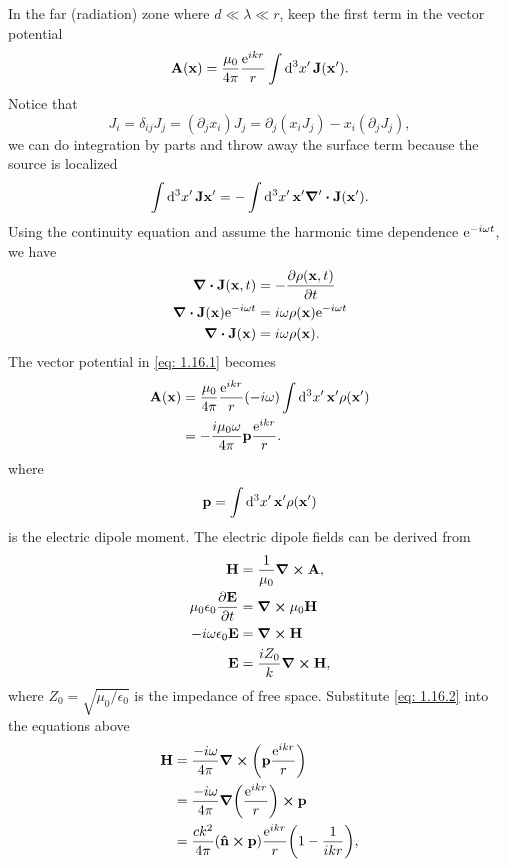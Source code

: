 \documentclass[10pt]{article}
\begin{document}
In the far (radiation) zone where $d \ll \lambda \ll r$, keep the first term in the vector potential
\begin{equation}
	\vb{A}(\vb{x}) = \frac{\mu_0}{4\pi} \frac{{\mathrm{e}}^{ikr}}{r} \int \dd[3]{x'} \vb{J}(\vb{x'}). \label{eq: 1.16.1}
\end{equation}
Notice that
\begin{equation}
	J_i = \delta_{ij} J_j = (\partial_j x_i) J_j = \partial_j(x_i J_j) - x_i (\partial_j J_j),
\end{equation}
we can do integration by parts and throw away the surface term because the source is localized
\begin{equation}
	\int \dd[3]{x'} \vb{J}{\vb{x'}} = - \int \dd[3]{x'} \vb{x'} \grad' \vdot \vb{J}(\vb{x'}).
\end{equation}
Using the continuity equation and assume the harmonic time dependence ${\mathrm{e}}^{-i\omega t}$, we have
\begin{align*}
	\div{\vb{J}(\vb{x},t)} &= -\pdv{\rho(\vb{x},t)}{t} \\
	\div{\vb{J}(\vb{x})} {\mathrm{e}}^{-i\omega t} &= i\omega \rho(\vb{x}) {\mathrm{e}}^{-i\omega t} \\
	\div{\vb{J}(\vb{x})} &= i\omega \rho(\vb{x}).
\end{align*}
The vector potential in \eqref{eq: 1.16.1} becomes
\begin{align}
	\vb{A}(\vb{x}) &= \frac{\mu_0}{4\pi} \frac{{\mathrm{e}}^{ikr}}{r} (-i\omega) \int \dd[3]{x'} \vb{x'} \rho(\vb{x'}) \nonumber \\
	&= -\frac{i \mu_0 \omega}{4\pi} \vb{p} \frac{{\mathrm{e}}^{ikr}}{r}. \label{eq: 1.16.2}
\end{align}
where
\begin{equation}
	\vb{p} = \int \dd[3]{x'} \vb{x'} \rho(\vb{x'})
\end{equation}
is the electric dipole moment.
The electric dipole fields can be derived from
\begin{align*}
	\vb{H} &= \frac{1}{\mu_0}\curl{\vb{A}}, \\
	\mu_0\epsilon_0\pdv{\vb{E}}{t} &= \curl{\mu_0 \vb{H}} \\
	-i\omega \epsilon_0 \vb{E} &= \curl{\vb{H}} \\
	\vb{E} &= \frac{i Z_0}{k} \curl{\vb{H}},
\end{align*}
where $Z_0 = \sqrt{\mu_0/\epsilon_0}$ is the impedance of free space. Substitute \eqref{eq: 1.16.2} into the equations above
\begin{align*}
	\vb{H} &= \frac{-i\omega}{4\pi} \curl(\vb{p} \frac{{\mathrm{e}}^{ikr}}{r}) \\
	&= \frac{-i\omega}{4\pi} \grad(\frac{{\mathrm{e}}^{ikr}}{r}) \cross \vb{p} \\
	&= \frac{ck^2}{4\pi} (\vu{n} \cross \vb{p}) \frac{{\mathrm{e}}^{ikr}}{r} \qty(1- \frac{1}{ikr}),
\end{align*}
\end{document}
